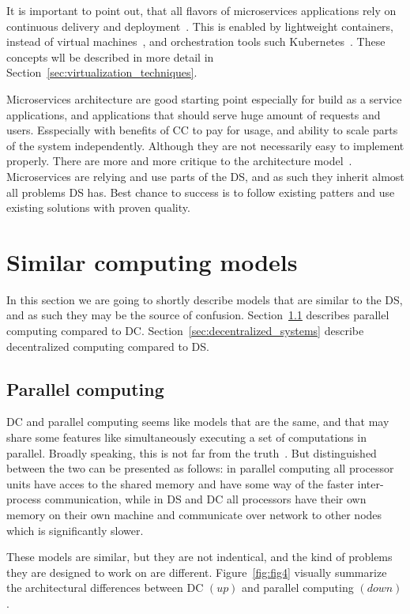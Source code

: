 It is important to point out, that all flavors of microservices applications rely on continuous delivery and deployment~\cite{7436659}. This is enabled by lightweight containers, instead of virtual machines~\cite{FelterFRR15}, and orchestration tools such Kubernetes~\cite{BurnsGOBW16}. These concepts wll be described in more detail in Section~\ref{sec:virtualization_techniques}.

Microservices architecture are good starting point especially for build as a service applications, and applications that should serve huge amount of requests and users. Esspecially with benefits of CC to pay for usage, and ability to scale parts of the system independently.  Although they are not necessarily easy to implement properly. There are more and more critique to the architecture model~\cite{SoldaniTH18}. Microservices are relying and use parts of the DS, and as such they inherit almost all problems DS has. Best chance to success is to follow existing patters and use existing solutions with proven quality.
%
%
\section{Similar computing models}\label{sec:similar_models}
%
In this section we are going to shortly describe models that are similar to the DS, and as such they may be the source of confusion.  Section~\ref{sec:parallel_computing} describes parallel computing compared to DC. Section~\ref{sec:decentralized_systems} describe decentralized computing compared to DS.
%
%
\subsection{Parallel computing}\label{sec:parallel_computing}
%
DC and parallel computing seems like models that are the same, and that may share some features like simultaneously executing a set of computations in parallel. Broadly speaking, this is not far from the truth~\cite{Vera16}. But distinguished between the two can be presented as follows: in parallel computing all processor units have acces to the shared memory and have some way of the faster inter-process communication, while in DS and DC all processors have their own memory on their own machine and communicate over network to other nodes which is significantly slower. 

These models are similar, but they are not indentical, and the kind of problems they are designed to work on are different. Figure~\ref{fig:fig4} visually summarize the architectural  differences between DC $(up)$ and parallel computing $(down)$.


